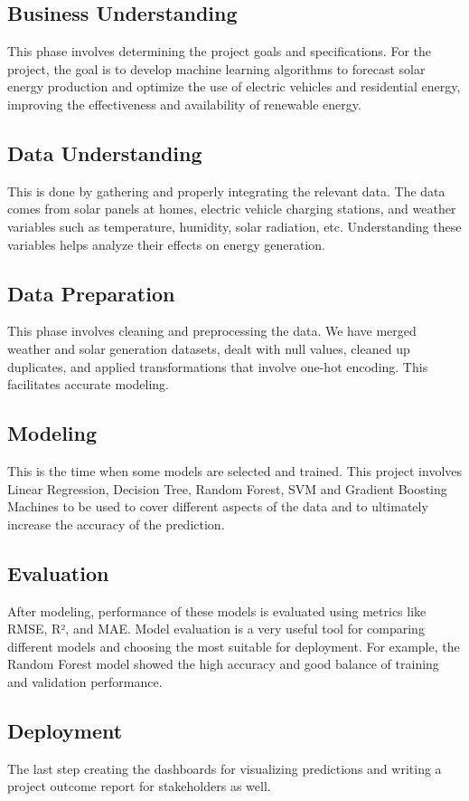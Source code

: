\documentclass[conference]{IEEEtran}
\begin{document}
\subsection{Business Understanding}
This phase involves determining the project goals and specifications. For the project, the goal is to develop machine learning algorithms to forecast solar energy production and optimize the use of electric vehicles and residential energy, improving the effectiveness and availability of renewable energy.
\subsection{Data Understanding}
This is done by gathering and properly integrating the relevant data. The data comes from solar panels at homes, electric vehicle charging stations, and weather variables such as temperature, humidity, solar radiation, etc. Understanding these variables helps analyze their effects on energy generation.
\subsection{Data Preparation}
This phase involves cleaning and preprocessing the data. We have merged weather and solar generation datasets, dealt with null values, cleaned up duplicates, and applied transformations that involve one-hot encoding. This facilitates accurate modeling.
\subsection{Modeling}
This is the time when some models are selected and trained. This project involves Linear Regression, Decision Tree, Random Forest, SVM and Gradient Boosting Machines to be used to cover different aspects of the data and to ultimately increase the accuracy of the prediction.
\subsection{Evaluation}
After modeling,   performance of these models is evaluated using metrics like RMSE, R², and MAE. Model evaluation is a very useful tool for comparing different models and choosing the most suitable for deployment. For example, the Random Forest model showed the high accuracy and good balance of training and validation performance.
\subsection{Deployment}
The last step creating the dashboards for visualizing predictions and writing a project outcome report for stakeholders as well. 
\end{document}

